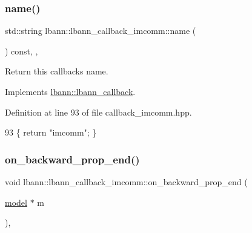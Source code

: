 \mbox{\label{classlbann_1_1lbann__callback__imcomm_af058602425005a1d198df40b7845e16e}} 
\subsubsection{\texorpdfstring{name()}{name()}}
{\footnotesize\ttfamily std\+::string lbann\+::lbann\+\_\+callback\+\_\+imcomm\+::name (\begin{DoxyParamCaption}{ }\end{DoxyParamCaption}) const\hspace{0.3cm}{\ttfamily [inline]}, {\ttfamily [override]}, {\ttfamily [virtual]}}

Return this callback\textquotesingle{}s name. 

Implements \hyperlink{classlbann_1_1lbann__callback_a7522c7a14f1d6a1ea762cc2d7248eb3a}{lbann\+::lbann\+\_\+callback}.



Definition at line 93 of file callback\+\_\+imcomm.\+hpp.


\begin{DoxyCode}
93 \{ \textcolor{keywordflow}{return} \textcolor{stringliteral}{"imcomm"}; \}
\end{DoxyCode}
\mbox{\label{classlbann_1_1lbann__callback__imcomm_a0a425ba562f7637b25cd6ba094e7885b}} 
\subsubsection{\texorpdfstring{on\+\_\+backward\+\_\+prop\+\_\+end()}{on\_backward\_prop\_end()}}
{\footnotesize\ttfamily void lbann\+::lbann\+\_\+callback\+\_\+imcomm\+::on\+\_\+backward\+\_\+prop\+\_\+end (\begin{DoxyParamCaption}\item[{\hyperlink{classlbann_1_1model}{model} $\ast$}]{m }\end{DoxyParamCaption})\hspace{0.3cm}{\ttfamily [override]}, {\ttfamily [virtual]}}

